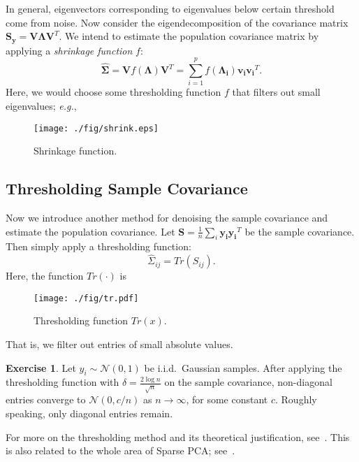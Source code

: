 \documentclass[11pt]{article}
\theoremstyle{definition}
\newtheorem{exercise}{Exercise}
\begin{document}
In general, eigenvectors corresponding to eigenvalues below certain threshold come from noise. Now consider the eigendecomposition of the covariance matrix $\mathbf{S_y} = \mathbf{V}\bm{\Lambda} \mathbf{V}^T$. We intend to estimate the population covariance matrix by  applying a {\it shrinkage function} $f$:
\[
    \bm{ \widehat{\Sigma} }= \mathbf{V}f(\bm{\Lambda})\mathbf{V}^T = \sum_{i=1}^p f(\bm{\Lambda_i})\mathbf{v_i} \mathbf{v_i}^T.
\]
Here, we would choose some thresholding function $f$ that filters out small eigenvalues; \textit{e.g.},
\begin{figure}[htbp]
    \centering
    \texttt{[image: ./fig/shrink.eps]}
    \caption{Shrinkage function.}
\end{figure}

\subsection{Thresholding Sample Covariance}
Now we introduce another method for denoising the sample covariance and estimate the population covariance. Let $\mathbf{S}= \frac{1}{n}\sum_{i}\mathbf{y_i}\mathbf{y_i}^T$ be the sample covariance. Then simply apply a thresholding function: $$\widehat{\Sigma}_{ij} = Tr(S_{ij}).$$ Here, the function $Tr(\cdot)$ is 
\begin{figure}[htbp]
    \centering
    \texttt{[image: ./fig/tr.pdf]}
    \caption{Thresholding function $Tr(x)$.}
\end{figure}
That is, we filter out entries of small absolute values.

\begin{exercise}
    Let $y_i\sim \mathcal{N}(0,1)$ be i.i.d.\ Gaussian samples. After applying the thresholding function with $\delta = \frac{2\log n}{\sqrt{n}}$ on the sample covariance,  non-diagonal entries converge to $\mathcal{N}(0,c/n)$ as $n\rightarrow \infty$, for some constant $c$. Roughly speaking, only diagonal entries remain.
\end{exercise}

For more on the thresholding method and its theoretical justification, see~\cite{bickel2008covariance}. This is also related to the whole area of Sparse PCA; see~\cite{johnstone2009consistency}.
\end{document}
